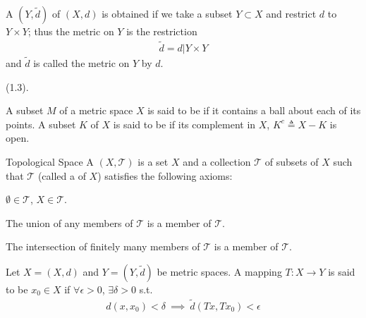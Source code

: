 \documentclass[11pt]{article}
\begin{document}
\begin{definition}
	A  $(Y, \tilde{d})$ of $(X, d)$ is obtained if we take a subset $Y \subset X$ and restrict $d$ to $Y \times Y$; thus the metric on $Y$ is the restriction
	\begin{align}
		\tilde{d} = d\big|{Y \times Y}
	\end{align}
	and $\tilde{d}$ is called the metric  on $Y$ by $d$. 
\end{definition}


 (1.3). 

\begin{definition}
	A subset $M$ of a metric space $X$ is said to be  if it contains a ball about each of its points. A subset $K$ of $X$ is said to be  if its complement in $X$, $K^c \triangleq X - K$ is open. 
\end{definition}

\begin{itemdefinition}{Topological Space}{
	A  $(X, \mathcal T)$ is a set $X$ and a collection $\mathcal T$ of subsets of $X$ such that $\mathcal T$ (called a  of $X$) satisfies the following axioms:}

	\item $\emptyset \in \mathcal T$, $X \in \mathcal T$.
	
	\item The union of any members of $\mathcal T$ is a member of $\mathcal T$.
	
	\item The intersection of finitely many members of $\mathcal T$ is a member of $\mathcal T$. 
\end{itemdefinition}

\begin{definition}
	Let $X = (X, d)$ and $Y = (Y, \tilde d)$ be metric spaces. A mapping $T: X \to Y$ is said to be  $x_0 \in X$ if $\forall \epsilon > 0$, $\exists \delta > 0$ s.t.
	\begin{align}
		d(x, x_0) < \delta ~ \implies ~ \tilde d(Tx, Tx_0) < \epsilon
	\end{align}
\end{definition}
\end{document}
